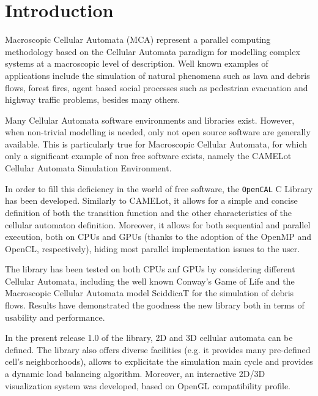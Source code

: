 \chapter{Introduction}

Macroscopic Cellular Automata (MCA) represent a parallel computing
methodology based on the Cellular Automata paradigm for modelling
complex systems at a macroscopic level of description. Well known
examples of applications include the simulation of natural phenomena
such as lava and debris flows, forest fires, agent based social
processes such as pedestrian evacuation and highway traffic problems,
besides many others.

Many Cellular Automata software environments and libraries exist.
However, when non-trivial modelling is needed, only not open source
software are generally available. This is particularly true for
Macroscopic Cellular Automata, for which only a significant example of
non free software exists, namely the CAMELot Cellular Automata
Simulation Environment.

In order to fill this deficiency in the world of free software, the
\verb'OpenCAL' C Library has been developed. Similarly to CAMELot, it
allows for a simple and concise definition of both the transition
function and the other characteristics of the cellular automaton
definition. Moreover, it allows for both sequential and parallel
execution, both on CPUs and GPUs (thanks to the adoption of the OpenMP
and OpenCL, respectively), hiding most parallel implementation issues
to the user.

The library has been tested on both CPUs anf GPUs by considering
different Cellular Automata, including the well known Conway's Game of
Life and the Macroscopic Cellular Automata model SciddicaT for the
simulation of debris flows. Results have demonstrated the goodness the
new library both in terms of usability and performance.

In the present release 1.0 of the library, 2D and 3D cellular automata
can be defined. The library also offers diverse facilities (e.g. it
provides many pre-defined cell's neighborhoods), allows to explicitate
the simulation main cycle and provides a dynamic load balancing
algorithm. Moreover, an interactive 2D/3D visualization system was
developed, based on OpenGL compatibility profile.
